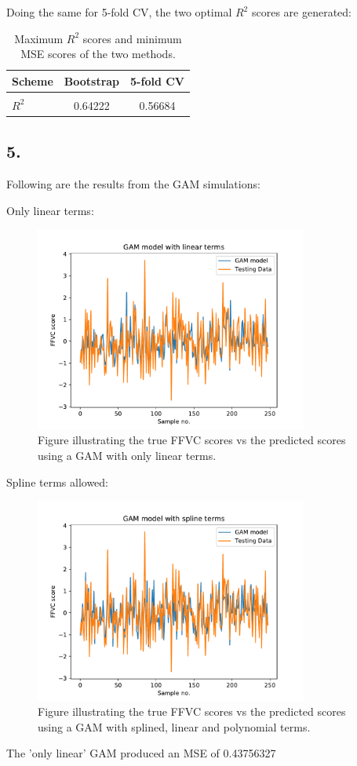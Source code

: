\documentclass[]{article}
\begin{document}
Doing the same for 5-fold CV, the two optimal $R^2$ scores are generated:

\begin{table}[H]
	\centering
	\caption{Maximum $R^2$ scores and minimum MSE scores of the two methods.}
	\begin{tabular}[t]{l@{\hskip 0.5in}c@{\hskip 0.5in}c}
		\toprule
		Scheme & Bootstrap & 5-fold CV \\
		\midrule
		 & & \\
		$R^2$ & 0.64222 & 0.56684 \\
		\bottomrule
	\end{tabular}
	\label{tab:E1P4}
\end{table}

\subsection*{5.}
Following are the results from the GAM simulations:

Only linear terms:
\begin{figure}[H]
	\centering
	\includegraphics[width=0.8\textwidth]{figures/GAM1_E1.pdf}
	\caption{Figure illustrating the true FFVC scores vs the predicted scores using a GAM with only linear terms.}
	\label{fig:GAM1E1}
\end{figure}
Spline terms allowed:
\begin{figure}[H]
	\centering
	\includegraphics[width=0.8\textwidth]{figures/GAM2_E1.pdf}
	\caption{Figure illustrating the true FFVC scores vs the predicted scores using a GAM with splined, linear and polynomial terms.}
	\label{fig:GAM2E1}
\end{figure}
The 'only linear' GAM produced an MSE of 0.43756327\\
\end{document}
